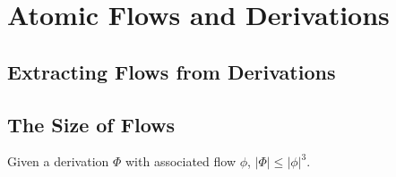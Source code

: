 \chapter{Atomic Flows and Derivations}

\section{Extracting Flows from Derivations}

\section{The Size of Flows}

\begin{theorem}
Given a derivation $\Phi$ with associated flow $\phi$, $|\Phi|\leq|\phi|^3$.
\end{theorem}